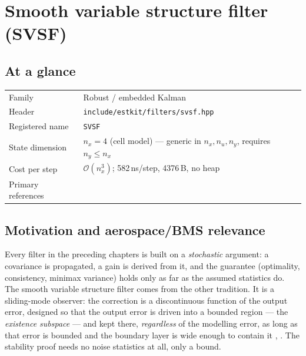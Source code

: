 \providecommand{\vf}{\bm{f}} \providecommand{\vh}{\bm{h}}
\providecommand{\vd}{\bm{d}} \providecommand{\mM}{\bm{M}}
\providecommand{\va}{\bm{a}} \providecommand{\vb}{\bm{b}}

\chapter{Smooth variable structure filter (SVSF)}
\label{ch:svsf}

\section*{At a glance}
\begin{tabular}{@{}l>{\raggedright\arraybackslash}p{}@{}}
Family & Robust / embedded Kalman \\
Header & \texttt{include/estkit/filters/svsf.hpp} \\
Registered name & \texttt{SVSF} \\
State dimension & $n_x = 4$ (cell model) --- generic in $n_x, n_u, n_y$, requires $n_y\le n_x$ \\
Cost per step & $\mathcal{O}(n_x^3)$; 582\,ns/step, 4376\,B, no heap \\
Primary references & \cite{habibi2007svsf,gadsden2010svsfcov,utkin1992,gadsden2011svsfkf} \\
\end{tabular}

\section{Motivation and aerospace/BMS relevance}
Every filter in the preceding chapters is built on a \emph{stochastic} argument: a covariance is
propagated, a gain is derived from it, and the guarantee (optimality, consistency, minimax
variance) holds only as far as the assumed statistics do.  The smooth variable structure filter
comes from the other tradition.  It is a sliding-mode observer: the correction is a discontinuous
function of the output error, designed so that the output error is driven into a bounded region ---
the \emph{existence subspace} --- and kept there, \emph{regardless} of the modelling error, as long
as that error is bounded and the boundary layer is wide enough to contain it
\cite[\S III]{habibi2007svsf}, \cite{utkin1992}.  The stability proof needs no noise statistics at
all, only a bound.


